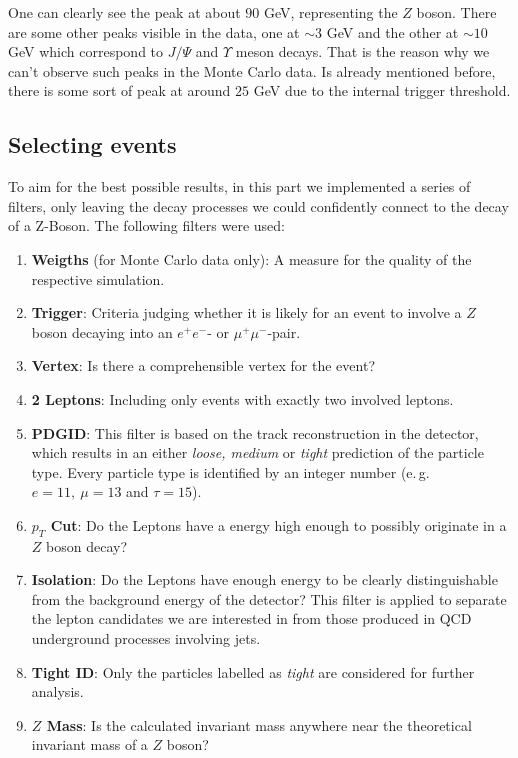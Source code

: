 \documentclass[twocolumn,
			   showpacs,%
               nofootinbib,
               aps,%
               prd,
               notitlepage,
               showkeys,
               10pt]{revtex4-1}
\begin{document}
One can clearly see the peak at about $90$ GeV, representing the $Z$ boson. There are some other peaks visible in the data, one at $\sim 3$ GeV and the other at $\sim 10$ GeV which correspond to $J/\Psi$ and $\Upsilon$ meson decays. That is the reason why we can't observe such peaks in the Monte Carlo data. Is already mentioned before, there is some sort of peak at around $25$ GeV due to the internal trigger threshold.

\subsection{Selecting events}
To aim for the best possible results, in this part we implemented a series of filters, only leaving the decay processes we could confidently connect to the decay of a Z-Boson.
The following filters were used:
\begin{enumerate}
\item \textbf{Weigths} (for Monte Carlo data only): A measure for the quality of the respective simulation.
\item \textbf{Trigger}: Criteria judging whether it is likely for an event to involve a $Z$ boson decaying into an $e^{+}e^{-}$- or $\mu^{+}\mu^{-}$-pair.
\item \textbf{Vertex}: Is there a comprehensible vertex for the event?
\item \textbf{2 Leptons}: Including only events with exactly two involved leptons.
\item \textbf{PDGID}: This filter is based on the track reconstruction in the detector, which results in an either \textit{loose, medium} or \textit{tight} prediction of the particle type. Every particle type is identified by an integer number (e.\,g. $e = 11 , \ \mu = 13$ and $\tau = 15$).
\item \textbf{$p_T$ Cut}: Do the Leptons have a energy high enough to possibly originate in a $Z$ boson decay?
\item \textbf{Isolation}: Do the Leptons have enough energy to be clearly distinguishable from the background energy of the detector? This filter is applied to separate the lepton candidates we are interested in from those produced in QCD underground processes involving jets.  
\item \textbf{Tight ID}: Only the particles labelled as \textit{tight} are considered for further analysis.
\item \textbf{$Z$ Mass}: Is the calculated invariant mass anywhere near the theoretical invariant mass of a $Z$ boson?
\end{enumerate}
\end{document}
